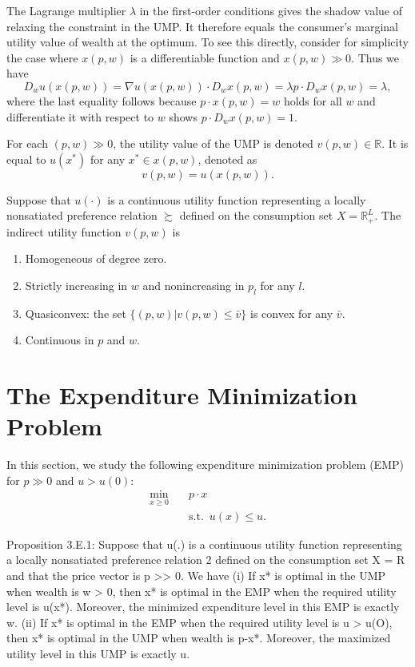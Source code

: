 \documentclass[11pt,fleqn]{book} %
\begin{document}
The Lagrange multiplier $\lambda$ in the first-order conditions gives
the shadow value of relaxing the constraint in the UMP. It therefore equals the consumer's marginal utility value of wealth at the optimum.
To see this directly, consider for simplicity the case where $x(p, w)$
is a differentiable function and $x(p, w) \gg 0$. Thus we have
\[
D_wu(x(p,w))=\nabla u(x(p,w))\cdot D_wx(p,w)=\lambda p\cdot D_wx(p,w)=\lambda,
\]
where the last equality follows because $p\cdot x(p, w) = w$ holds for all $w$ and differentiate it with respect to $w$ shows $p\cdot D_wx(p,w)= 1$.

\begin{definition}
	For each $(p, w) \gg 0$, the utility value of the UMP is denoted $v(p, w)\in \mathbb{R}$. It is equal to $u(x^*)$ for any $x^*\in x(p, w)$, denoted as
	\[
	v(p, w)=u(x(p, w)).
	\]
	
\end{definition}


\begin{proposition}
Suppose that $u(\cdot)$ is a continuous utility function representing a
locally nonsatiated preference relation $\succsim$ defined on the consumption set $X=\mathbb{R}_+^L$. The indirect utility function $v(p, w)$ is	
\begin{enumerate}
	\item Homogeneous of degree zero.
	\item Strictly increasing in $w$ and nonincreasing in $p_l$ for any $l$.
	\item Quasiconvex: the set $\{(p, w)| v(p, w)\le \bar{v}\}$ is convex for any $\bar{v}$.
	\item Continuous in $p$ and $w$. 
\end{enumerate}
\end{proposition}

\section{The Expenditure Minimization Problem}

In this section, we study the following expenditure minimization problem (EMP) for
$p\gg 0$ and $u > u(0)$:
\begin{align*}
\min_{x\ge 0} \quad &  p\cdot x\\
& \mathrm{s.t.}\ \; u(x)\le u.
\end{align*}


\begin{proposition}
Proposition 3.E.1: Suppose that u(.) is a continuous utility function representing a
locally nonsatiated preference relation 2 defined on the consumption set X = R
and that the price vector is p >> 0. We have
(i) If x* is optimal in the UMP when wealth is w > 0, then x* is optimal in the
EMP when the required utility level is u(x*). Moreover, the minimized
expenditure level in this EMP is exactly w.
(ii) If x* is optimal in the EMP when the required utility level is u > u(O), then
x* is optimal in the UMP when wealth is p-x*. Moreover, the maximized
utility level in this UMP is exactly u.

\end{proposition}
\end{document}
